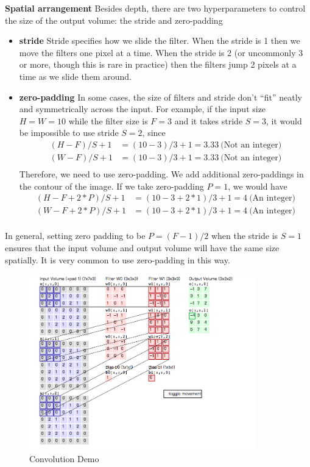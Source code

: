 \documentclass[twoside]{article}
\begin{document}
\textbf{Spatial arrangement} Besides depth, there are two hyperparameters to control the size of the output volume: the stride and zero-padding
\begin{itemize}
\item \textbf{stride} Stride specifies how we slide the filter. When the stride is 1 then we move the filters one pixel at a time. When the stride is 2 (or uncommonly 3 or more, though this is rare in practice) then the filters jump 2 pixels at a time as we slide them around.
\item \textbf{zero-padding} In some cases, the size of filters and stride don’t “fit” neatly and symmetrically across the input. For example, if the input size $H=W=10$ while the filter size is $F=3$ and it takes stride $S=3$, it would be impossible to use stride $S=2$, since
\begin{equation}
\begin{aligned}
(H-F)/S+1&=(10-3)/3+1=3.33~\text{(Not an integer)}\\
(W-F)/S+1&=(10-3)/3+1=3.33~\text{(Not an integer)}\\
\end{aligned}
\end{equation}
Therefore, we need to use zero-padding. We add additional zero-paddings in the contour of the image. If we take zero-padding $P=1$, we would have
\begin{equation}
\begin{aligned}
(H-F+2*P)/S+1&=(10-3+2*1)/3+1=4~\text{(An integer)}\\
(W-F+2*P)/S+1&=(10-3+2*1)/3+1=4~\text{(An integer)}\\
\end{aligned}
\end{equation}
\end{itemize}

In general, setting zero padding to be $P=(F−1)/2$ when the stride is $S=1$ ensures that the input volume and output volume will have the same size spatially. It is very common to use zero-padding in this way.

\begin{figure}[!htb]
\centering
\includegraphics[height = 3in]{pics/cnn.png}
\caption{Convolution Demo\cite{cs231n-website}}
\label{fig:conv_demo}
\end{figure}
\end{document}

